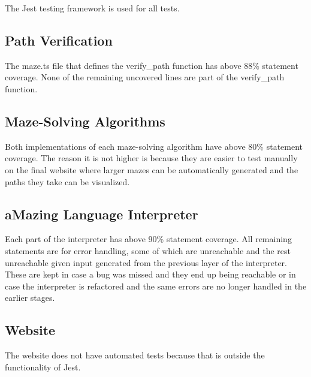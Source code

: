The Jest \cite{jest} testing framework is used for all tests.

\subsection{Path Verification}

The maze.ts file that defines the verify\_path function has above 88\% statement coverage. None of the remaining uncovered lines are part of the verify\_path function.

\subsection{Maze-Solving Algorithms}

Both implementations of each maze-solving algorithm have above 80\% statement coverage. The reason it is not higher is because they are easier to test manually on the final website where larger mazes can be automatically generated and the paths they take can be visualized.

\subsection{aMazing Language Interpreter}

Each part of the interpreter has above 90\% statement coverage. All remaining statements are for error handling, some of which are unreachable and the rest unreachable given input generated from the previous layer of the interpreter. These are kept in case a bug was missed and they end up being reachable or in case the interpreter is refactored and the same errors are no longer handled in the earlier stages.

\subsection{Website}

The website does not have automated tests because that is outside the functionality of Jest.
